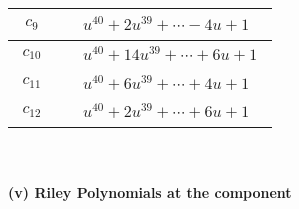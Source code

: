 \documentclass[1p]{elsarticle_modified}
\theoremstyle{definition}
\begin{document}
\begin{tabular}{m{50pt}|m{274pt}}
\hline $$\begin{aligned}c_{9}\end{aligned}$$&$\begin{aligned}
&u^{40}+2 u^{39}+\cdots-4 u+1
\end{aligned}$\\
\hline $$\begin{aligned}c_{10}\end{aligned}$$&$\begin{aligned}
&u^{40}+14 u^{39}+\cdots+6 u+1
\end{aligned}$\\
\hline $$\begin{aligned}c_{11}\end{aligned}$$&$\begin{aligned}
&u^{40}+6 u^{39}+\cdots+4 u+1
\end{aligned}$\\
\hline $$\begin{aligned}c_{12}\end{aligned}$$&$\begin{aligned}
&u^{40}+2 u^{39}+\cdots+6 u+1
\end{aligned}$\\
\hline
\end{tabular}\\~\\
\newpage\renewcommand{\arraystretch}{1}
\flushleft \textbf{(v) Riley Polynomials at the component}\newline \\
\end{document}
